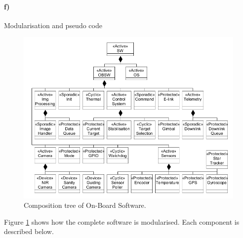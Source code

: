 \clearpage
\paragraph{f)} Modularisation and pseudo code

\begin{figure}[H]
	\centering
	\includegraphics[width=\textwidth]{4-experiment-design/img/software/composition-tree.png}
	\caption{Composition tree of On-Board Software.}
	\label{fig:software-composition-tree}
\end{figure}

Figure \ref{fig:software-composition-tree} shows how the complete software is modularised. Each component is described below.

